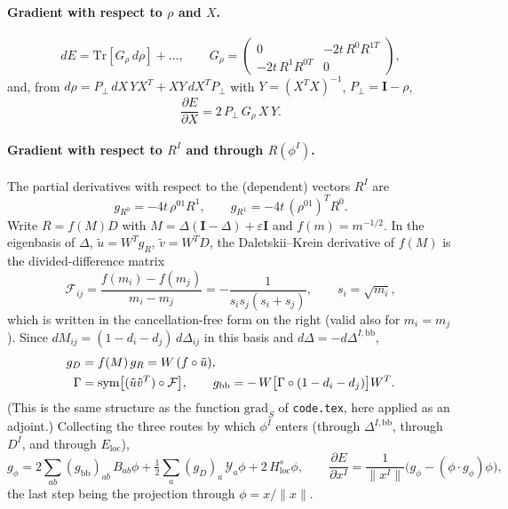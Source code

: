\documentclass[11pt]{article}
\newcommand{\Ybb}{\Delta^{I,\mathrm{bb}}}
\begin{document}
\paragraph{Gradient with respect to $\rho$ and $X$.}
\begin{equation}
  dE=\mathrm{Tr}[G_\rho\,d\rho]+\dots,\qquad
  G_\rho=\begin{pmatrix}0&-2t\,R^{0}R^{1T}\\-2t\,R^{1}R^{0T}&0\end{pmatrix},
\end{equation}
and, from $d\rho=P_\perp\,dX\,YX^{T}+XY\,dX^{T}P_\perp$ with $Y=(X^TX)^{-1}$, $P_\perp=\mathbf I-\rho$,
\begin{equation}
  \frac{\partial E}{\partial X}=2\,P_\perp\,G_\rho\,X\,Y .
  \label{eq:gX}
\end{equation}

\paragraph{Gradient with respect to $R^I$ and through $R(\phi^I)$.} The partial
derivatives with respect to the (dependent) vectors $R^I$ are
\begin{equation}
  g_{R^{0}}=-4t\,\rho^{01}R^{1},\qquad g_{R^{1}}=-4t\,(\rho^{01})^{T}R^{0}.
\end{equation}
Write $R=f(M)D$ with $M=\Delta(\mathbf I-\Delta)+\varepsilon\mathbf I$ and $f(m)=m^{-1/2}$.
In the eigenbasis of $\Delta$, $\tilde u=W^Tg_R$, $\tilde v=W^TD$, the Daletskii--Krein
derivative of $f(M)$ is the divided-difference matrix
\begin{equation}
  \mathcal F_{ij}=\frac{f(m_i)-f(m_j)}{m_i-m_j}
  =-\frac{1}{s_is_j(s_i+s_j)},\qquad s_i=\sqrt{m_i},
  \label{eq:Fdiv}
\end{equation}
which is written in the cancellation-free form on the right (valid also for $m_i=m_j$).
Since $dM_{ij}=(1-d_i-d_j)\,d\Delta_{ij}$ in this basis and $d\Delta=-d\Ybb$,
\begin{align}
  g_{D}&=f(M)\,g_R=W\,(f\circ\tilde u),\notag\\
  \Gamma&=\mathrm{sym}\bigl[(\tilde u\tilde v^{T})\circ\mathcal F\bigr],\qquad
  g_{\mathrm{bb}}=-\,W\bigl[\Gamma\circ(1-d_i-d_j)\bigr]W^{T}.
\end{align}
(This is the same structure as the function $\mathrm{grad}_S$ of \texttt{code.tex},
here applied as an adjoint.) Collecting the three routes by which $\phi^I$ enters
(through $\Ybb$, through $D^I$, and through $E_{\mathrm{loc}}$),
\begin{equation}
  g_{\phi}=2\sum_{ab}(g_{\mathrm{bb}})_{ab}\,B_{ab}\phi
      +\tfrac12\sum_{a}(g_{D})_{a}\,\mathcal Y_{a}\phi
      +2\,H^{s}_{\mathrm{loc}}\phi,
  \qquad
  \frac{\partial E}{\partial x^{I}}=\frac{1}{\lVert x^{I}\rVert}\bigl(g_\phi-(\phi\!\cdot\! g_\phi)\phi\bigr),
  \label{eq:gphi}
\end{equation}
the last step being the projection through $\phi=x/\lVert x\rVert$.
\end{document}
